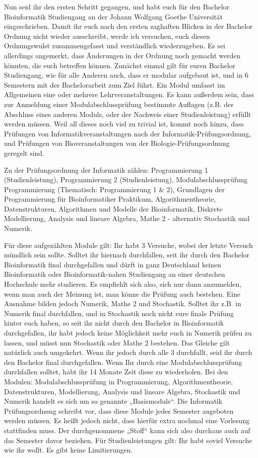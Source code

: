Nun seid ihr den ersten Schritt gegangen, und habt euch für den Bachelor Bioinformatik Studiengang an der Johann Wolfgang Goethe Universität eingeschrieben. Damit ihr euch nach den ersten zaghaften Blicken in der Bachelor Ordnung nicht wieder ausschreibt, werde ich versuchen, euch diesen Ordnungswulst zusammengefasst und verständlich wiederzugeben. Es sei allerdings angemerkt, dass Änderungen in der Ordnung noch gemacht werden könnten, die euch betreffen können. Zunächst einmal gilt für euren Bachelor Studiengang, wie für alle Anderen auch, dass er modular aufgebaut ist, und in 6 Semestern mit der Bachelorarbeit zum Ziel führt. Ein Modul umfasst im Allgemeinen eine oder mehrere Lehrveranstaltungen. Es kann außerdem sein, dass zur Anmeldung einer Modulabschlussprüfung bestimmte Auflagen (z.B. der Abschluss eines anderen Moduls, oder der Nachweis einer Studienleistung) erfüllt werden müssen. Weil all dieses noch viel zu trivial ist, kommt noch hinzu, dass Prüfungen von Informatikveranstaltungen nach der Informatik-Prüfungsordnung, und Prüfungen von Bioveranstaltungen von der Biologie-Prüfungsordnung geregelt sind.

Zu der Prüfungsordnung der Informatik zählen: Programmierung 1 (Studienleistung), Programmierung 2 (Studienleistung), Modulabschlussprüfung Programmierung (Thematisch: Programmierung 1 \& 2), Grundlagen der Programmierung für Bioinformatiker Praktikum, Algorithmentheorie, Datenstrukturen, Algorithmen und Modelle der Bioinformatik, Diskrete Modellierung, Analysis und lineare Algebra, Mathe 2 - alternativ Stochastik und Numerik.

Für diese aufgezählten Module gilt: Ihr habt 3 Versuche, wobei der letzte Versuch mündlich sein sollte. Solltet ihr hiernach durchfallen, seit ihr durch den Bachelor Bioinformatik final durchgefallen und dürft in ganz Deutschland keinen Bioinformatik oder Bioinformatik-nahen Studiengang an einer deutschen Hochschule mehr studieren. Es empfiehlt sich also, sich nur dann anzumelden, wenn man auch der Meinung ist, man könne die Prüfung auch bestehen. Eine Ausnahme bilden jedoch Numerik, Mathe 2 und Stochastik. Solltet ihr z.B. in Numerik final durchfallen, und in Stochastik noch nicht eure finale Prüfung hinter euch haben, so seit ihr nicht durch den Bachelor in Bioinformatik durchgefallen, ihr habt jedoch keine Möglichkeit mehr euch in Numerik prüfen zu lassen, und müsst nun Stochastik oder Mathe 2 bestehen. Das Gleiche gilt natürlich auch umgekehrt. Wenn ihr jedoch durch alle 3 durchfallt, seid ihr durch den Bachelor final durchgefallen. Wenn Ihr durch eine Modulabschlussprüfung durchfallen solltet, habt ihr 14 Monate Zeit diese zu wiederholen. Bei den Modulen: Modulabschlussprüfung in Programmierung, Algorithmentheorie, Datenstrukturen, Modellierung, Analysis und lineare Algebra, Stochastik und Numerik handelt es sich um so genannte „Basismodule“. Die Informatik Prüfungsordnung schreibt vor, dass diese Module jedes Semester angeboten werden müssen. Es heißt jedoch nicht, dass hierfür extra nochmal eine Vorlesung stattfinden muss. Der durchgenommene „Stoff“ kann sich also durchaus auch auf das Semester davor beziehen. Für Studienleistungen gilt: Ihr habt soviel Versuche wie ihr wollt. Es gibt keine Limitierungen.

